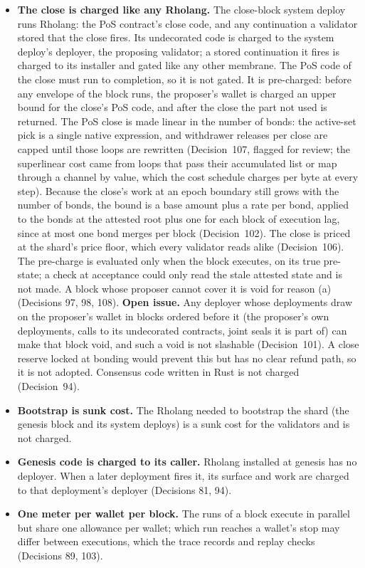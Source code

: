 \documentclass[11pt]{article}
\begin{document}
\begin{itemize}
\item \textbf{The close is charged like any Rholang.} The close-block system deploy runs Rholang: the PoS contract's close code, and any continuation a validator stored that the close fires. Its undecorated code is charged to the system deploy's deployer, the proposing validator; a stored continuation it fires is charged to its installer and gated like any other membrane. The PoS code of the close must run to completion, so it is not gated. It is pre-charged: before any envelope of the block runs, the proposer's wallet is charged an upper bound for the close's PoS code, and after the close the part not used is returned. The PoS close is made linear in the number of bonds: the active-set pick is a single native expression, and withdrawer releases per close are capped until those loops are rewritten (Decision~107, flagged for review; the superlinear cost came from loops that pass their accumulated list or map through a channel by value, which the cost schedule charges per byte at every step). Because the close's work at an epoch boundary still grows with the number of bonds, the bound is a base amount plus a rate per bond, applied to the bonds at the attested root plus one for each block of execution lag, since at most one bond merges per block (Decision~102). The close is priced at the shard's price floor, which every validator reads alike (Decision~106). The pre-charge is evaluated only when the block executes, on its true pre-state; a check at acceptance could only read the stale attested state and is not made. A block whose proposer cannot cover it is void for reason (a) (Decisions 97, 98, 108). \textbf{Open issue.} Any deployer whose deployments draw on the proposer's wallet in blocks ordered before it (the proposer's own deployments, calls to its undecorated contracts, joint seals it is part of) can make that block void, and such a void is not slashable (Decision~101). A close reserve locked at bonding would prevent this but has no clear refund path, so it is not adopted. Consensus code written in Rust is not charged (Decision~94).
\item \textbf{Bootstrap is sunk cost.} The Rholang needed to bootstrap the shard (the genesis block and its system deploys) is a sunk cost for the validators and is not charged.
\item \textbf{Genesis code is charged to its caller.} Rholang installed at genesis has no deployer. When a later deployment fires it, its surface and work are charged to that deployment's deployer (Decisions 81, 94).
\item \textbf{One meter per wallet per block.} The runs of a block execute in parallel but share one allowance per wallet; which run reaches a wallet's stop may differ between executions, which the trace records and replay checks (Decisions 89, 103).

\end{itemize}
\end{document}
